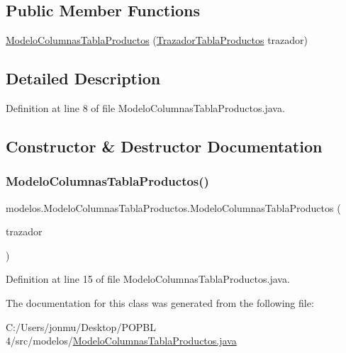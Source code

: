 \subsection*{Public Member Functions}
\begin{DoxyCompactItemize}
\item 
\mbox{\hyperlink{classmodelos_1_1_modelo_columnas_tabla_productos_a7807b42a8c5c5630006122c92b2d9a84}{Modelo\+Columnas\+Tabla\+Productos}} (\mbox{\hyperlink{classrenderer_1_1_trazador_tabla_productos}{Trazador\+Tabla\+Productos}} trazador)
\end{DoxyCompactItemize}


\subsection{Detailed Description}


Definition at line 8 of file Modelo\+Columnas\+Tabla\+Productos.\+java.



\subsection{Constructor \& Destructor Documentation}
\mbox{\label{classmodelos_1_1_modelo_columnas_tabla_productos_a7807b42a8c5c5630006122c92b2d9a84}} 
\subsubsection{\texorpdfstring{Modelo\+Columnas\+Tabla\+Productos()}{ModeloColumnasTablaProductos()}}
{\footnotesize\ttfamily modelos.\+Modelo\+Columnas\+Tabla\+Productos.\+Modelo\+Columnas\+Tabla\+Productos (\begin{DoxyParamCaption}\item[{\mbox{\hyperlink{classrenderer_1_1_trazador_tabla_productos}{Trazador\+Tabla\+Productos}}}]{trazador }\end{DoxyParamCaption})}



Definition at line 15 of file Modelo\+Columnas\+Tabla\+Productos.\+java.



The documentation for this class was generated from the following file\+:\begin{DoxyCompactItemize}
\item 
C\+:/\+Users/jonmu/\+Desktop/\+P\+O\+P\+B\+L 4/src/modelos/\mbox{\hyperlink{_modelo_columnas_tabla_productos_8java}{Modelo\+Columnas\+Tabla\+Productos.\+java}}\end{DoxyCompactItemize}
